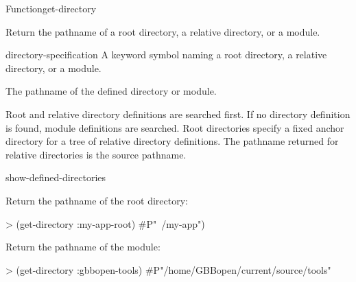 \documentclass[10pt,twoside,english,pdftex]{article}
\begin{document}

\begin{functiondoc}{Function}{get-directory}{
    \returns{} }
%

\fnsyntax 

\fnpurpose Return the pathname of a root directory, a relative
directory, or a module.

\fnpackage {}

\fnmodule {}

\fnargs
\begin{args}{directory-specification}
\arg[name] A keyword symbol naming a root directory, a relative directory, 
or a module.
\end{args}

\fnreturns The pathname of the defined directory or module.

\fndescription Root and relative directory definitions are searched
first.  If no  directory definition is found, module
definitions are searched.  Root directories specify a fixed anchor
directory for a tree of relative directory definitions.  The pathname
returned for relative directories is the source pathname.

\begin{alsos}{show-defined-directories}
\end{alsos}

\fnexamples

Return the pathname of the  root directory:
\begin{example}
> (get-directory :my-app-root)
#P"~/my-app")
\end{example}

Return the pathname of the  module:
\begin{example}
> (get-directory :gbbopen-tools)
#P"/home/GBBopen/current/source/tools"
\end{example}

\end{functiondoc}

\end{document}
